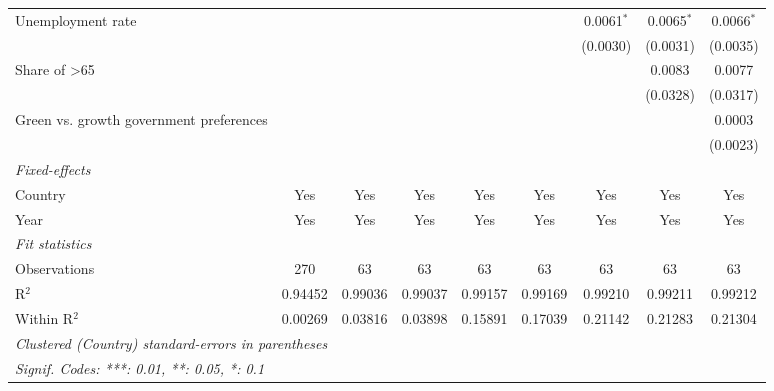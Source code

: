 \begin{table}[htbp]
\begin{tabular}{lcccccccc}
      Unemployment rate                                         &          &          &          &              &              & 0.0061$^{*}$ & 0.0065$^{*}$ & 0.0066$^{*}$\\   
                                                                &          &          &          &              &              & (0.0030)     & (0.0031)     & (0.0035)\\   
      Share of >65                                              &          &          &          &              &              &              & 0.0083       & 0.0077\\   
                                                                &          &          &          &              &              &              & (0.0328)     & (0.0317)\\   
      Green vs. growth government preferences                   &          &          &          &              &              &              &              & 0.0003\\   
                                                                &          &          &          &              &              &              &              & (0.0023)\\   
      \midrule
      \emph{Fixed-effects}\\
      Country                                                   & Yes      & Yes      & Yes      & Yes          & Yes          & Yes          & Yes          & Yes\\  
      Year                                                      & Yes      & Yes      & Yes      & Yes          & Yes          & Yes          & Yes          & Yes\\  
      \midrule
      \emph{Fit statistics}\\
      Observations                                              & 270      & 63       & 63       & 63           & 63           & 63           & 63           & 63\\  
      R$^2$                                                     & 0.94452  & 0.99036  & 0.99037  & 0.99157      & 0.99169      & 0.99210      & 0.99211      & 0.99212\\  
      Within R$^2$                                              & 0.00269  & 0.03816  & 0.03898  & 0.15891      & 0.17039      & 0.21142      & 0.21283      & 0.21304\\  
      \midrule \midrule
      \multicolumn{9}{l}{\emph{Clustered (Country) standard-errors in parentheses}}\\
      \multicolumn{9}{l}{\emph{Signif. Codes: ***: 0.01, **: 0.05, *: 0.1}}\\
   \end{tabular}
\end{table}


